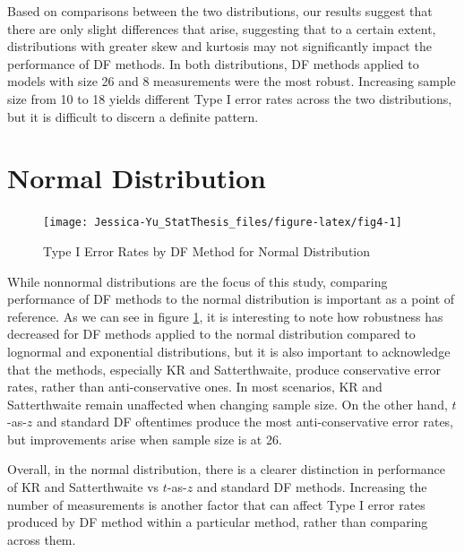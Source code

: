\documentclass[12pt, twoside]{amherstthesis}
\begin{document}
Based on comparisons between the two distributions, our results suggest that there are only slight differences that arise, suggesting that to a certain extent, distributions with greater skew and kurtosis may not significantly impact the performance of DF methods. In both distributions, DF methods applied to models with size 26 and 8 measurements were the most robust. Increasing sample size from 10 to 18 yields different Type I error rates across the two distributions, but it is difficult to discern a definite pattern.

\hypertarget{normal-distribution}{%
\section{Normal Distribution}\label{normal-distribution}}
\begin{figure}

{\centering \texttt{[image: Jessica-Yu\_StatThesis\_files/figure-latex/fig4-1]} 

}

\caption{Type I Error Rates by DF Method for Normal Distribution}\label{fig:fig4}
\end{figure}
While nonnormal distributions are the focus of this study, comparing performance of DF methods to the normal distribution is important as a point of reference. As we can see in figure \ref{fig:fig4}, it is interesting to note how robustness has decreased for DF methods applied to the normal distribution compared to lognormal and exponential distributions, but it is also important to acknowledge that the methods, especially KR and Satterthwaite, produce conservative error rates, rather than anti-conservative ones. In most scenarios, KR and Satterthwaite remain unaffected when changing sample size. On the other hand, \(t\)-as-\(z\) and standard DF oftentimes produce the most anti-conservative error rates, but improvements arise when sample size is at 26.

Overall, in the normal distribution, there is a clearer distinction in performance of KR and Satterthwaite vs \(t\)-as-\(z\) and standard DF methods. Increasing the number of measurements is another factor that can affect Type I error rates produced by DF method within a particular method, rather than comparing across them.
\end{document}
